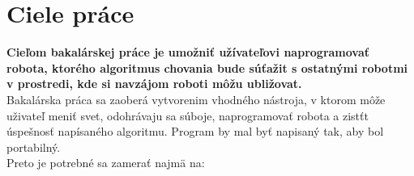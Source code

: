 \section{Ciele práce}%
{\bf Cieľom bakalárskej práce je umožniť užívateľovi naprogramovať robota, ktorého algoritmus chovania bude súťažit s ostatnými robotmi v prostredi, kde si navzájom roboti môžu ubližovat.}\\ %
Bakalárska práca sa zaoberá vytvorenim vhodného nástroja, v ktorom môže uživateľ meniť svet, odohrávaju sa súboje, naprogramovať robota a zistťt úspešnosť napísaného algoritmu. Program by mal byť napisaný  tak, aby bol portabilný.\\ 
\newline
Preto je potrebné sa zamerať najmä na: %
